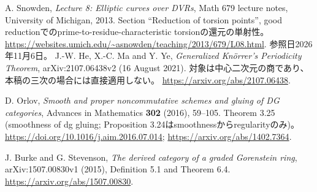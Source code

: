 A. Snowden, \emph{Lecture 8: Elliptic curves over DVRs},
Math 679 lecture notes, University of Michigan, 2013.
Section ``Reduction of torsion points'', good reductionでのprime-to-residue-characteristic torsionの還元の単射性。
\url{https://websites.umich.edu/~asnowden/teaching/2013/679/L08.html}.
参照日2026年11月6日。
J.-W. He, X.-C. Ma and Y. Ye, \emph{Generalized Kn\"orrer's Periodicity Theorem},
arXiv:2107.06438v2 (16 August 2021).
対象は中心二次元の商であり、本稿の三次の場合には直接適用しない。
\url{https://arxiv.org/abs/2107.06438}.

D. Orlov,
\emph{Smooth and proper noncommutative schemes and gluing of DG categories},
Advances in Mathematics \textbf{302} (2016), 59--105.
Theorem 3.25 (smoothness of dg gluing; Proposition 3.24はsmoothnessからregularityのみ)。
\url{https://doi.org/10.1016/j.aim.2016.07.014};
\url{https://arxiv.org/abs/1402.7364}.

J. Burke and G. Stevenson,
\emph{The derived category of a graded Gorenstein ring},
arXiv:1507.00830v1 (2015), Definition 5.1 and Theorem 6.4.
\url{https://arxiv.org/abs/1507.00830}.
